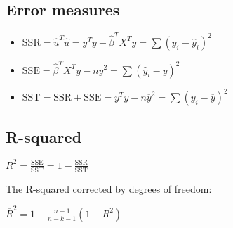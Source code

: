 \documentclass[10pt, a4paper, landscape]{extarticle}
\newcommand{\SSR}{\mathrm{SSR}}
\newcommand{\SSE}{\mathrm{SSE}}
\newcommand{\SST}{\mathrm{SST}}
\begin{document}
\begin{multicols}{3}
	\subsection*{Error measures}
		\begin{itemize}[leftmargin=*]
			\item $\SSR = \hat{u}^T \hat{u} = y^T y - \hat{\beta}^T X^T y = \sum(y_i - \hat{y}_i)^2$
			\item $\SSE = \hat{\beta}^T X^T y - n \overline{y}^2 = \sum(\hat{y}_i - \overline{y})^2$
			\item $\SST = \SSR + \SSE = y^T y - n \overline{y}^2 = \sum(y_i - \overline{y})^2$
		\end{itemize}
	\subsection*{R-squared}
	\begin{center}
		$R^2 = \frac{\SSE}{\SST} = 1 - \frac{\SSR}{\SST}$
	\end{center}
	The R-squared corrected by degrees of freedom:
	\begin{center}
		$\overline{R}^2 = 1 - \frac{n - 1}{n - k - 1} (1 - R^2)$
	\end{center}
	
\columnbreak


\end{multicols}
\end{document}
